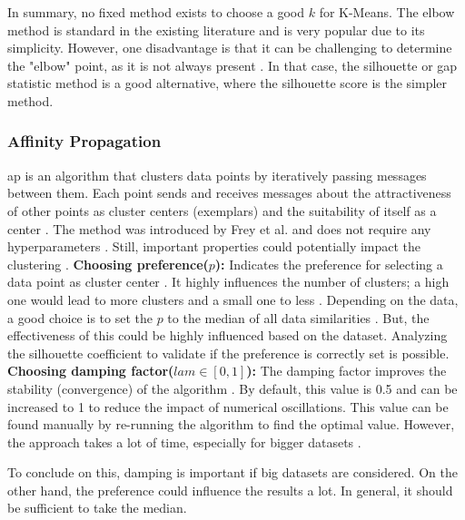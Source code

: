 In summary, no fixed method exists to choose a good $k$ for K-Means.
The elbow method is standard in the existing literature and is very popular due to its simplicity.
However, one disadvantage is that it can be challenging to determine the "elbow" point, as it is not always present \citep{kodinariya_review_2013}.
In that case, the silhouette or gap statistic method is a good alternative, where the silhouette score is the simpler method.
\subsubsection{Affinity Propagation} \label{theory:clustering-ap}
\gls{ap} is an algorithm that clusters data points by iteratively passing messages between them.
Each point sends and receives messages about the attractiveness of other points as cluster centers (exemplars) and the suitability of itself as a center \citep{keller_balancing_2021}.
The method was introduced by Frey et al. and does not require any hyperparameters \citep{frey_clustering_2007}.
Still, important properties could potentially impact the clustering \citep{wang_adaptive_2007}. \newline
\textbf{Choosing preference($p$): }
Indicates the preference for selecting a data point as cluster center \citep{wang_adaptive_2007}.
It highly influences the number of clusters; a high one would lead to more clusters and a small one to less \citep{moiane_evaluation_2018}.
Depending on the data, a good choice is to set the $p$ to the median of all data similarities \citep{wang_adaptive_2007}.
But, the effectiveness of this could be highly influenced based on the dataset.
Analyzing the silhouette coefficient \citep{moiane_evaluation_2018} to validate if the preference is correctly set is possible.
\newline
\textbf{Choosing damping factor($lam \in [0,1] $):}
The damping factor improves the stability (convergence) of the algorithm \citep{wang_adaptive_2007}.
By default, this value is 0.5 and can be increased to 1 to reduce the impact of numerical oscillations.
This value can be found manually by re-running the algorithm to find the optimal value.
However, the approach takes a lot of time, especially for bigger datasets \citep{wang_adaptive_2007}. \newline

To conclude on this, damping is important if big datasets are considered.
On the other hand, the preference could influence the results a lot.
In general, it should be sufficient to take the median.
